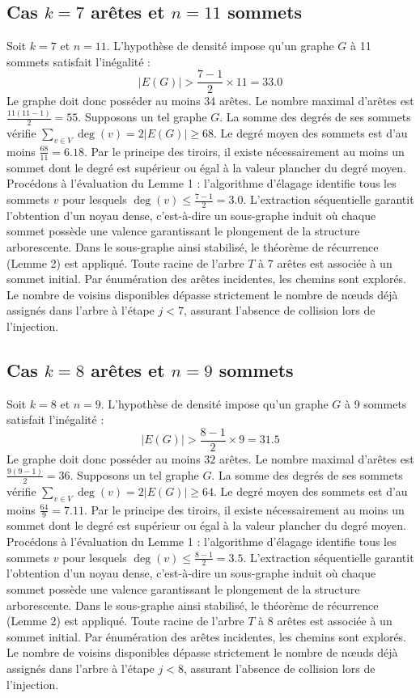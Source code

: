 \documentclass[12pt,a4paper]{article}
\begin{document}
\subsection{Cas $k = 7$ arêtes et $n = 11$ sommets}
Soit $k = 7$ et $n = 11$. L'hypothèse de densité impose qu'un graphe $G$ à 11 sommets satisfait l'inégalité :
$$ |E(G)| > \frac{7-1}{2} \times 11 = 33.0 $$
Le graphe doit donc posséder au moins $34$ arêtes. Le nombre maximal d'arêtes est $\frac{11(11-1)}{2} = 55$.
Supposons un tel graphe $G$. La somme des degrés de ses sommets vérifie $\sum_{v \in V} \deg(v) = 2|E(G)| \geq 68$.
Le degré moyen des sommets est d'au moins $\frac{68}{11} = 6.18$.
Par le principe des tiroirs, il existe nécessairement au moins un sommet dont le degré est supérieur ou égal à la valeur plancher du degré moyen.
Procédons à l'évaluation du Lemme 1 : l'algorithme d'élagage identifie tous les sommets $v$ pour lesquels $\deg(v) \leq \frac{7-1}{2} = 3.0$.
L'extraction séquentielle garantit l'obtention d'un noyau dense, c'est-à-dire un sous-graphe induit où chaque sommet possède une valence garantissant le plongement de la structure arborescente.
Dans le sous-graphe ainsi stabilisé, le théorème de récurrence (Lemme 2) est appliqué. Toute racine de l'arbre $T$ à 7 arêtes est associée à un sommet initial. Par énumération des arêtes incidentes, les chemins sont explorés. Le nombre de voisins disponibles dépasse strictement le nombre de nœuds déjà assignés dans l'arbre à l'étape $j < 7$, assurant l'absence de collision lors de l'injection.

\subsection{Cas $k = 8$ arêtes et $n = 9$ sommets}
Soit $k = 8$ et $n = 9$. L'hypothèse de densité impose qu'un graphe $G$ à 9 sommets satisfait l'inégalité :
$$ |E(G)| > \frac{8-1}{2} \times 9 = 31.5 $$
Le graphe doit donc posséder au moins $32$ arêtes. Le nombre maximal d'arêtes est $\frac{9(9-1)}{2} = 36$.
Supposons un tel graphe $G$. La somme des degrés de ses sommets vérifie $\sum_{v \in V} \deg(v) = 2|E(G)| \geq 64$.
Le degré moyen des sommets est d'au moins $\frac{64}{9} = 7.11$.
Par le principe des tiroirs, il existe nécessairement au moins un sommet dont le degré est supérieur ou égal à la valeur plancher du degré moyen.
Procédons à l'évaluation du Lemme 1 : l'algorithme d'élagage identifie tous les sommets $v$ pour lesquels $\deg(v) \leq \frac{8-1}{2} = 3.5$.
L'extraction séquentielle garantit l'obtention d'un noyau dense, c'est-à-dire un sous-graphe induit où chaque sommet possède une valence garantissant le plongement de la structure arborescente.
Dans le sous-graphe ainsi stabilisé, le théorème de récurrence (Lemme 2) est appliqué. Toute racine de l'arbre $T$ à 8 arêtes est associée à un sommet initial. Par énumération des arêtes incidentes, les chemins sont explorés. Le nombre de voisins disponibles dépasse strictement le nombre de nœuds déjà assignés dans l'arbre à l'étape $j < 8$, assurant l'absence de collision lors de l'injection.
\end{document}
